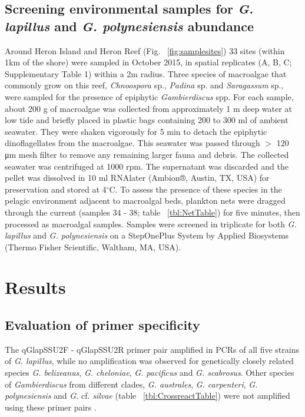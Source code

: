 \documentclass[12pt]{article}
\begin{document}
\subsection*{Screening environmental samples for \emph{G. lapillus} and \emph{G. polynesiensis} abundance}
Around Heron Island and Heron Reef (Fig. ~\ref{fig:samplesites}) 33 sites (within 1km of the shore) were sampled in October 2015, in spatial replicates (A, B, C; Supplementary Table 1) within a 2m radius. Three species of macroalgae that commonly grow on this reef, \textit{Chnoospora} sp., \textit{Padina} sp. and \textit{Saragassum} sp., were sampled for the presence of epiphytic \emph{Gambierdiscus} spp. For each sample, about 200 g of macroalgae was collected from approximately 1 m deep water at low tide and briefly placed in plastic bags containing 200 to 300 ml of ambient seawater. They were shaken vigorously for 5 min to detach the epiphytic dinoflagellates from the macroalgae. This seawater was passed through $>$ 120 μm mesh filter to remove any remaining larger fauna and debris. The collected seawater was centrifuged at 1000 rpm. The supernatant was discarded and the pellet was dissolved in 10 ml RNAlater (Ambion®, Austin, TX, USA) for preservation and stored at 4$^{\circ}$C.
To assess the presence of these species in the pelagic environment adjacent to macroalgal beds, plankton nets were dragged through the current (samples 34 - 38; table ~\ref{tbl:NetTable}) for five minutes, then processed as macroalgal samples.
Samples were screened in triplicate for both \emph{G. lapillus} and \emph{G. polynesiensis} on a StepOnePlus System by Applied Biosystems (Thermo Fisher Scientific, Waltham, MA, USA).



\newpage
\section*{Results}
\subsection*{Evaluation of primer specificity}
The qGlapSSU2F - qGlapSSU2R primer pair amplified in PCRs of all five strains of \emph{G. lapillus}, while no amplification was observed for genetically closely related species \emph{G. belizeanus}, \emph{G. cheloniae}, \emph{G. pacificus} and \emph{G. scabrosus}. Other species of \emph{Gambierdiscus} from different clades, \emph{G. australes}, \emph{G. carpenteri}, \emph{G. polynesiensis} and \emph{G.} cf. \emph{silvae} (table ~\ref{tbl:CrossreactTable}) were not amplified using these primer pairs \citep{smith2016new,kretzschmar2016characterization}.
\end{document}

